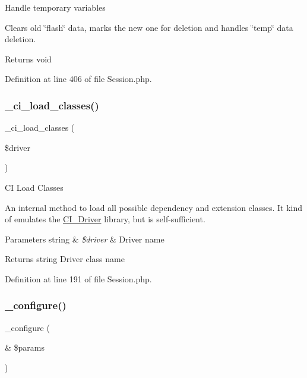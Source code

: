 Handle temporary variables

Clears old \char`\"{}flash\char`\"{} data, marks the new one for deletion and handles \char`\"{}temp\char`\"{} data deletion.

\begin{DoxyReturn}{Returns}
void 
\end{DoxyReturn}


Definition at line 406 of file Session.\+php.

\mbox{\label{class_c_i___session_ae4203f92a9f8a01d2498649f79acb0f9}} 
\subsubsection{\texorpdfstring{\_ci\_load\_classes()}{\_ci\_load\_classes()}}
{\footnotesize\ttfamily \+\_\+ci\+\_\+load\+\_\+classes (\begin{DoxyParamCaption}\item[{}]{\$driver }\end{DoxyParamCaption})\hspace{0.3cm}{\ttfamily [protected]}}

CI Load Classes

An internal method to load all possible dependency and extension classes. It kind of emulates the \mbox{\hyperlink{class_c_i___driver}{C\+I\+\_\+\+Driver}} library, but is self-\/sufficient.


\begin{DoxyParams}[1]{Parameters}
string & {\em \$driver} & Driver name \\
\hline
\end{DoxyParams}
\begin{DoxyReturn}{Returns}
string Driver class name 
\end{DoxyReturn}


Definition at line 191 of file Session.\+php.

\mbox{\label{class_c_i___session_a71e7f49b0627505b4a7dbc8ce368279b}} 
\subsubsection{\texorpdfstring{\_configure()}{\_configure()}}
{\footnotesize\ttfamily \+\_\+configure (\begin{DoxyParamCaption}\item[{\&}]{\$params }\end{DoxyParamCaption})\hspace{0.3cm}{\ttfamily [protected]}}

